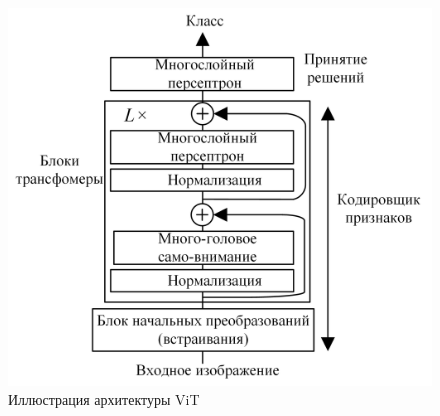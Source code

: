 \documentclass[12pt]{article}
\begin{document}
\begin{sloppypar}
\begin{figure}[!h]
	\begin{center}
		\includegraphics[width=0.7\linewidth]{./figuresch1/transformer_vit.png}
		\caption{Иллюстрация архитектуры ViT}	
		\label{ch1:fig:transformer_vit}
	\end{center}
\end{figure}


\end{sloppypar}
\end{document}
